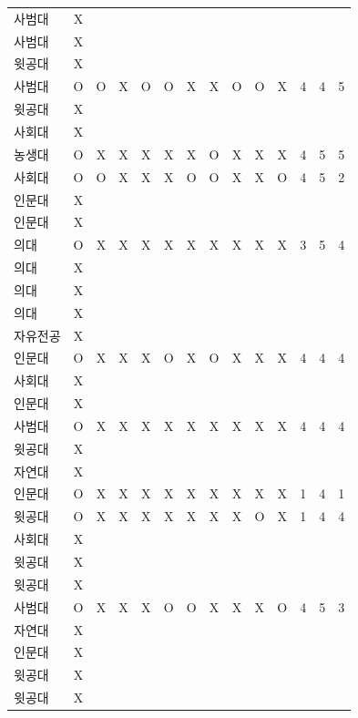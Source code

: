 \documentclass[11pt,a4paper]{article}
\begin{document}
\begin{center}
\begin{tabular}{ | p{2cm} | c | c | c | c | c | c | c | c | c | c | c | c | c | }
사범대 & X & & & & & & & & & & & & \\
사범대 & X & & & & & & & & & & & & \\
윗공대 & X & & & & & & & & & & & & \\
사범대 & O & O & X & O & O & X & X & O & O & X & 4 & 4 & 5 \\
윗공대 & X & & & & & & & & & & & & \\
사회대 & X & & & & & & & & & & & & \\
농생대 & O & X & X & X & X & X & O & X & X & X & 4 & 5 & 5 \\
사회대 & O & O & X & X & X & O & O & X & X & O & 4 & 5 & 2 \\
인문대 & X & & & & & & & & & & & & \\
인문대 & X & & & & & & & & & & & & \\
의대 & O & X & X & X & X & X & X & X & X & X & 3 & 5 & 4 \\
의대 & X & & & & & & & & & & & & \\
의대 & X & & & & & & & & & & & & \\
의대 & X & & & & & & & & & & & & \\
자유전공 & X & & & & & & & & & & & & \\
인문대 & O & X & X & X & O & X & O & X & X & X & 4 & 4 & 4 \\
사회대 & X & & & & & & & & & & & & \\
인문대 & X & & & & & & & & & & & & \\
사범대 & O & X & X & X & X & X & X & X & X & X & 4 & 4 & 4 \\
윗공대 & X & & & & & & & & & & & & \\
자연대 & X & & & & & & & & & & & & \\
인문대 & O & X & X & X & X & X & X & X & X & X & 1 & 4 & 1 \\
윗공대 & O & X & X & X & X & X & X & X & O & X & 1 & 4 & 4 \\
사회대 & X & & & & & & & & & & & & \\
윗공대 & X & & & & & & & & & & & & \\
윗공대 & X & & & & & & & & & & & & \\
사범대 & O & X & X & X & O & O & X & X & X & O & 4 & 5 & 3 \\
자연대 & X & & & & & & & & & & & & \\
인문대 & X & & & & & & & & & & & & \\
윗공대 & X & & & & & & & & & & & & \\
윗공대 & X & & & & & & & & & & & & \\

\end{tabular}
\end{center}
\end{document}
